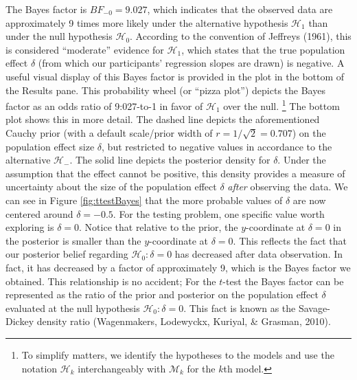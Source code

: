 \documentclass[english,,doc,floatsintext]{apa6}
\begin{document}
The Bayes factor is \(BF_{-0}=9.027\), which indicates that the observed data are approximately 9 times more likely under the alternative hypothesis \(\mathcal{H}_{1}\) than under the null hypothesis \(\mathcal{H}_{0}\). According to the convention of Jeffreys (1961), this is considered ``moderate'' evidence for \(\mathcal{H}_{1}\), which states that the true population effect \(\delta\) (from which our participants' regression slopes are drawn) is negative. A useful visual display of this Bayes factor is provided in the plot in the bottom of the Results pane. This probability wheel (or ``pizza plot'') depicts the Bayes factor as an odds ratio of 9:027-to-1 in favor of \(\mathcal{H}_{1}\) over the null.
\footnote{To simplify matters, we identify the hypotheses to the models and use the notation \( \mathcal{H}_{k} \) interchangeably with \( \mathcal{M}_{k} \) for the \( k \)th model.}
The bottom plot shows this in more detail. The dashed line depicts the aforementioned Cauchy prior (with a default scale/prior width of \(r=1/\sqrt{2} = 0.707\)) on the population effect size \(\delta\), but restricted to negative values in accordance to the alternative \(\mathcal{H}_{-}\). The solid line depicts the posterior density for \(\delta\). Under the assumption that the effect cannot be positive, this density provides a measure of uncertainty about the size of the population effect \(\delta\) \emph{after} observing the data. We can see in Figure \ref{fig:ttestBayes} that the more probable values of \(\delta\) are now centered around \(\delta = -0.5\). For the testing problem, one specific value worth exploring is \(\delta=0\). Notice that relative to the prior, the \(y\)-coordinate at \(\delta=0\) in the posterior is smaller than the \(y\)-coordinate at \(\delta=0\). This reflects the fact that our posterior belief regarding \(\mathcal{H}_{0} : \delta = 0\) has decreased after data observation. In fact, it has decreased by a factor of approximately 9, which is the Bayes factor we obtained. This relationship is no accident; For the \(t\)-test the Bayes factor can be represented as the ratio of the prior and posterior on the population effect \(\delta\) evaluated at the null hypothesis \(\mathcal{H}_{0}: \delta = 0\). This fact is known as the Savage-Dickey density ratio (Wagenmakers, Lodewyckx, Kuriyal, \& Grasman, 2010).
\end{document}
